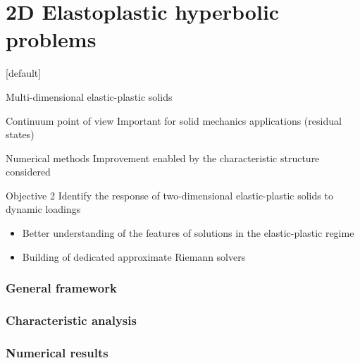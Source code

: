 \documentclass[11pt,aspectratio=1610]{beamer}
\makeatletter
\let\oldpart\part
\def\part#1{\def\@currentlabelname{#1}\oldpart{#1}}
\newenvironment{withoutheadline}{
  \setbeamertemplate{headline}[default]
  \def\beamer@entrycode{\vspace*{-\headheight}}
}{}
\makeatother
\begin{document}
\part{2D Elastoplastic hyperbolic problems}
\label{part:part2}
\begin{withoutheadline}
\begin{frame}{Multi-dimensional elastic-plastic solids}
  
  \begin{block}{Continuum point of view}
    Important for solid mechanics applications (residual states)\\
    \centering
  \end{block}
  
  \begin{block}{Numerical methods}
    Improvement enabled by the characteristic structure considered 
  \end{block}
  \pause
  \begin{block}{Objective 2}
    Identify the response of two-dimensional elastic-plastic solids to dynamic loadings
    \begin{itemize}
    \item Better understanding of the features of solutions in the elastic-plastic regime
    \item Building of dedicated approximate Riemann solvers
    \end{itemize}
  \end{block} 
\end{frame}
\end{withoutheadline}

\section{General framework}


\section{Characteristic analysis}


\section{Numerical results}

\end{document}
